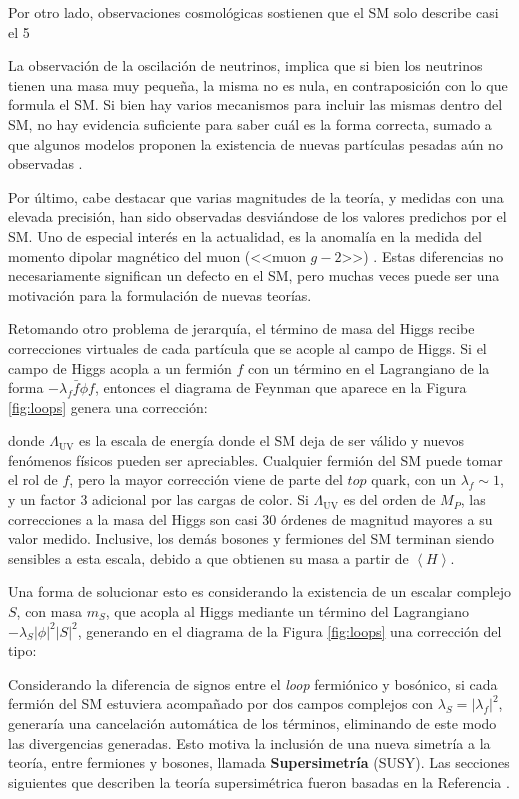 Por otro lado, observaciones cosmológicas sostienen que el SM solo describe casi el 5

La observación de la oscilación de neutrinos, implica que si bien los neutrinos tienen una masa muy pequeña, la misma no es nula, en contraposición con lo que formula el SM. Si bien hay varios mecanismos para incluir las mismas dentro del SM, no hay evidencia suficiente para saber cuál es la forma correcta, 
sumado a que algunos modelos proponen la existencia de nuevas partículas pesadas aún no observadas \cite{gellmann2013,Sawada:1979dis,Glashow:1979nm,Ramond1998}.

Por último, cabe destacar que varias magnitudes de la teoría, y medidas con una elevada precisión, han sido observadas desviándose de los valores predichos por el SM. Uno de especial interés en la actualidad, es la anomalía en la medida del momento dipolar magnético del muon (<<muon $g-2$>>) \cite{Muong-2:2021ojo}. Estas diferencias no necesariamente significan un defecto en el SM, pero muchas veces puede ser una motivación para la formulación de nuevas teorías.


Retomando otro problema de jerarquía, el término de masa del Higgs recibe correcciones virtuales de cada partícula que se acople al campo de Higgs. 
Si el campo de Higgs acopla a un fermión $f$ con un término en el Lagrangiano de la forma $-\lambda_f \bar{f} \phi f$, entonces el diagrama de Feynman que aparece en la Figura \ref{fig:loops} genera una corrección:



donde $\Lambda_{\text{UV}}$ es la escala de energía donde el SM deja de ser válido y nuevos fenómenos físicos pueden ser apreciables. Cualquier fermión del SM puede tomar el rol de $f$, pero la mayor corrección viene de parte del $top$ quark, con un $\lambda_f\sim1$, y un factor $3$ adicional por las cargas de color. Si $\Lambda_{\text{UV}}$ es del orden de $M_P$, las correcciones a la masa del Higgs son casi 30 órdenes de magnitud mayores a su valor medido. 
Inclusive, los demás bosones y fermiones del SM terminan siendo sensibles a esta escala, debido a que obtienen su masa a partir de $\left<H\right>$.


Una forma de solucionar esto es considerando la existencia de un escalar complejo $S$, con masa $m_S$, que acopla al Higgs mediante un término del Lagrangiano $-\lambda_S |\phi|^2|S|^2$, generando en el diagrama de la Figura \ref{fig:loops} una corrección del tipo:

Considerando la diferencia de signos entre el \textit{loop} fermiónico y bosónico, si cada fermión del SM estuviera acompañado por dos campos complejos con $\lambda_S = |\lambda_f|^2$, generaría una cancelación automática de los términos, eliminando de este modo las divergencias generadas. Esto motiva la inclusión de una nueva simetría a la teoría, entre fermiones y bosones, llamada \textbf{Supersimetría} (SUSY). Las secciones siguientes que describen la teoría supersimétrica fueron basadas en la Referencia \cite{Martin:1997ns}.



